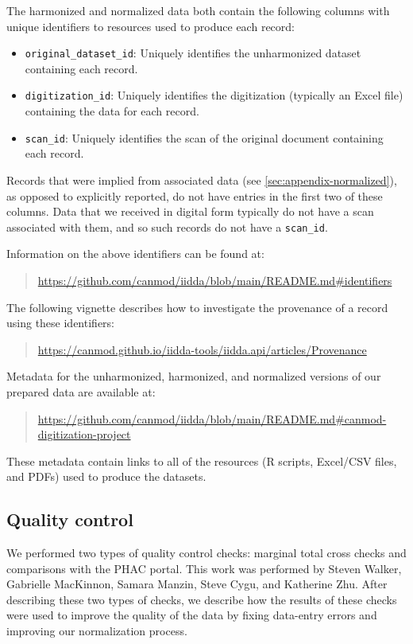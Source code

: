 \documentclass[12pt]{article}
\begin{document}
The harmonized and normalized data both contain the following columns with unique identifiers to resources used to produce each record:
\begin{itemize}
  \item \texttt{original\_dataset\_id}: Uniquely identifies the unharmonized dataset containing each record.
  \item \texttt{digitization\_id}: Uniquely identifies the digitization (typically an Excel file) containing the data for each record.
  \item \texttt{scan\_id}: Uniquely identifies the scan of the original document containing each record.
\end{itemize}
Records that were implied from associated data (see \cref{sec:appendix-normalized}), as opposed to explicitly reported, do not have entries in the first two of these columns. Data that we received in digital form typically do not have a scan associated with them, and so such records do not have a \texttt{scan\_id}.

Information on the above identifiers can be found at:
\begin{quote}
  \url{https://github.com/canmod/iidda/blob/main/README.md#identifiers}
\end{quote}
The following vignette describes how to investigate the provenance of a record using these identifiers:
\begin{quote}
  \url{https://canmod.github.io/iidda-tools/iidda.api/articles/Provenance}
\end{quote}
Metadata for the unharmonized, harmonized, and normalized versions of our prepared data are available at:
\begin{quote}
\url{https://github.com/canmod/iidda/blob/main/README.md#canmod-digitization-project}
\end{quote}
These metadata contain links to all of the resources (R scripts, Excel/CSV files, and PDFs) used to produce the datasets.

\subsection{Quality control}\label{sec:appendix-quality-control}

We performed two types of quality control checks: marginal total cross checks and comparisons with the PHAC portal. This work was performed by Steven Walker, Gabrielle MacKinnon, Samara Manzin, Steve Cygu, and Katherine Zhu. After describing these two types of checks, we describe how the results of these checks were used to improve the quality of the data by fixing data-entry errors and improving our normalization process.
\end{document}
